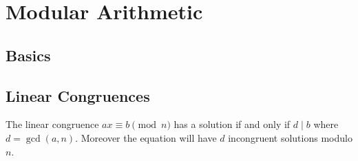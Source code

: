 \chapter{Modular Arithmetic}

\section{Basics}

\section{Linear Congruences}

\begin{theorem}
    The linear congruence $ax \equiv b \pmod{n}$ has a solution if and only if $d\mid b$ 
    where $d=\gcd(a,n)$. Moreover the equation will have $d$ incongruent solutions modulo $n$.
\end{theorem}
